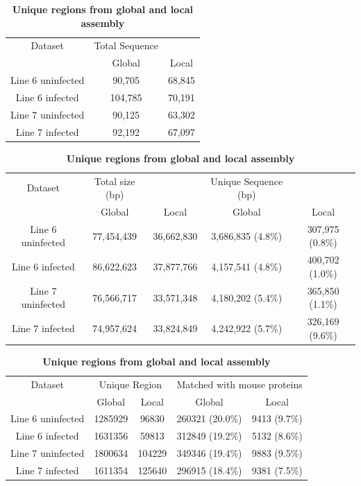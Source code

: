 \documentclass[10pt]{article}
\begin{document}
\begin{table}[!ht]

\caption{
\bf{Total unique sequences from global and local assembly (k=$21-31$)}}
\begin{tabular}{ccc}
\hline
Dataset & Total Sequence & \\
        & Global & Local \\
\hline
Line 6 uninfected & 90,705 & 68,845\\
Line 6 infected & 104,785 & 70,191 \\
Line 7 uninfected & 90,125 & 63,302\\
Line 7 infected &  92,192 & 67,097 \\
\hline
\end{tabular}
\label{total_sequences}

\caption{
\bf{Unique sequences between global and local assembly}}
\begin{tabular}{ccccc}
\hline
Dataset & Total size (bp) & & Unique Sequence (bp) & \\
        & Global & Local & Global & Local\\
\hline
Line 6 uninfected & 77,454,439 & 36,662,830 & 3,686,835 (4.8\%) & 307,975 (0.8\%)\\
Line 6 infected & 86,622,623 & 37,877,766 & 4,157,541 (4.8\%)& 400,702 (1.0\%)\\
Line 7 uninfected & 76,566,717 & 33,571,348 & 4,180,202 (5.4\%) & 365,850 (1.1\%)\\
Line 7 infected & 74,957,624 & 33,824,849 & 4,242,922 (5.7\%)& 326,169 (9.6\%)\\
\hline
\end{tabular}
\label{unique_sequences}

\caption{
\bf{Unique regions from global and local assembly}}
\begin{tabular}{ccccc}
\hline
Dataset & \multicolumn{2}{c}{Unique Region} & \multicolumn{2}{c}{Matched with mouse proteins}\\
 & Global & Local & Global & Local\\
\hline
Line 6 uninfected & 1285929 & 96830 & 260321 (20.0\%) & 9413 (9.7\%)\\
Line 6 infected & 1631356 & 59813 & 312849 (19.2\%)& 5132 (8.6\%)\\
Line 7 uninfected & 1800634 & 104229 & 349346 (19.4\%) & 9883 (9.5\%)\\
Line 7 infected & 1611354 & 125640 & 296915 (18.4\%)& 9381 (7.5\%)\\
\hline
\end{tabular}
\label{unique_sequences_matched_mouse}


\end{table}
\end{document}

